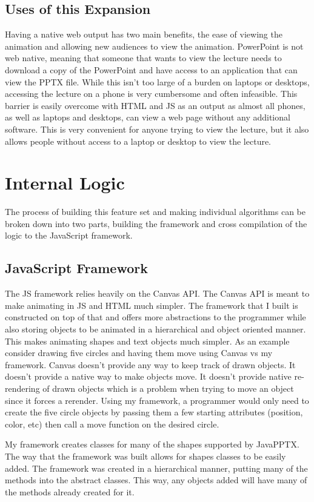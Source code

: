 \documentclass[12pt,twoside]{reedthesis}
\begin{document}
\subsection{Uses of this Expansion}
Having a native web output has two main benefits, the ease of viewing the animation and allowing new audiences to view the animation. PowerPoint is not web native, meaning that someone that wants to view the lecture needs to download a copy of the PowerPoint and have access to an application that can view the PPTX file. While this isn't too large of a burden on laptops or desktops, accessing the lecture on a phone is very cumbersome and often infeasible. This barrier is easily overcome with HTML and JS as an output as almost all phones, as well as laptops and desktops, can view a web page without any additional software. This is very convenient for anyone trying to view the lecture, but it also allows people without access to a laptop or desktop to view the lecture. 

\section{Internal Logic}
The process of building this feature set and making individual algorithms can be broken down into two parts, building the framework and cross compilation of the logic to the JavaScript framework.

\subsection{JavaScript Framework}
The JS framework relies heavily on the Canvas API. The Canvas API is meant to make animating in JS and HTML much simpler. The framework that I built is constructed on top of that and offers more abstractions to the programmer while also storing objects to be animated in a hierarchical and object oriented manner. This makes animating shapes and text objects much simpler. As an example consider drawing five circles and having them move using Canvas vs my framework. Canvas doesn't provide any way to keep track of drawn objects. It doesn't provide a native way to make objects move. It doesn't provide native re-rendering of drawn objects which is a problem when trying to move an object since it forces a rerender. Using my framework, a programmer would only need to create the five circle objects by passing them a few starting attributes (position, color, etc) then call a move function on the desired circle.

My framework creates classes for many of the shapes supported by JavaPPTX. The way that the framework was built allows for shapes classes to be easily added. The framework was created in a hierarchical manner, putting many of the methods into the abstract classes. This way, any objects added will have many of the methods already created for it. 
\end{document}
